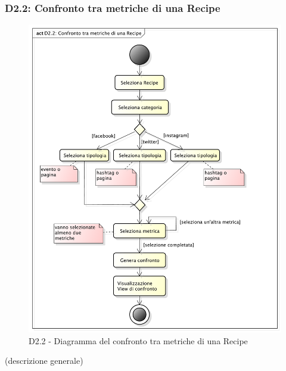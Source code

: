		\subsubsection{D2.2: Confronto tra metriche di una Recipe} %
		\label{ssub:confronto_tra_metriche_di_una_recipe}
		\begin{figure}[!htbp]
			\centering
			\centerline{\includegraphics[scale=0.45]{./images/D2_2.pdf}}
			\caption{D2.2 - Diagramma del confronto tra metriche di una Recipe}
		\end{figure}
		\noindent
		[TO DO] (descrizione generale)


